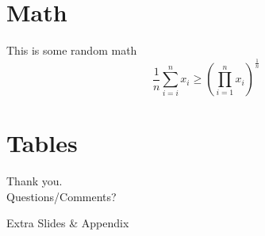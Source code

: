 \documentclass[9pt]{beamer}
\begin{document}
	\section[Math]{Math}
	\begin{frame}[Math]{This is some random math}
		\begin{equation}
			\frac{1}{n} \sum_{i=i}^{n} x_{i} \geq
			\left(\prod _{i=1}^{n}x_{i}\right)^{\frac {1}{n}}
		\end{equation}
	\end{frame}



	\section[Tables]{Tables}


	{ %
		\begin{frame}[standout]
			Thank you.\\
			Questions/Comments? \\
		\end{frame}
	}



	\appendix

	{
		\begin{frame}[standout]{}
			Extra Slides \& Appendix
		\end{frame}
	}


\end{document}
